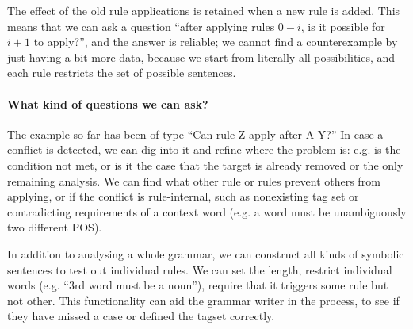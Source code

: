 
The effect of the old rule applications is retained when a new rule is added.
This means that we can ask a question ``after applying rules $0-i$, is it possible for $i+1$ to apply?'', and the answer is reliable; we cannot find a counterexample by just having a bit more data, because we start from literally all possibilities, and each rule restricts the set of possible sentences.


\paragraph{What kind of questions we can ask?}

The example so far has been of type ``Can rule Z apply after A-Y?''
In case a conflict is detected, we can dig into it and refine where the problem is: e.g. is the condition not met, or is it the case that the target is already removed or the only remaining analysis.
We can find what other rule or rules prevent others from applying, or if the conflict is rule-internal, such as nonexisting tag set or contradicting requirements of a context word (e.g. a word must be unambiguously two different POS).


In addition to analysing a whole grammar, 
we can construct all kinds of symbolic sentences to test out individual rules. 
We can set the length, restrict individual words (e.g. ``3rd word must be a noun''), require that it triggers some rule but not other. 
This functionality can aid the grammar writer in the process, to see if they have missed a case or defined the tagset correctly.






